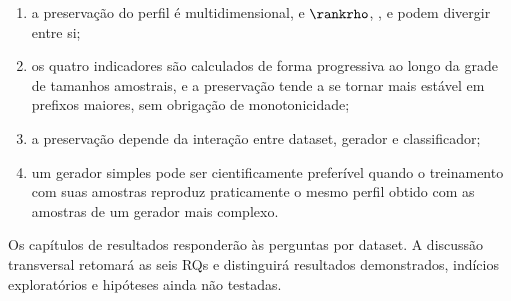 \begin{enumerate}
  \item a preservação do perfil é multidimensional, e $\rankrho$, \WinnersAgreement{}, \ReversalExistenceAgreement{} e \ReversalSampleSizeSimilarity{} podem divergir entre si;
  \item os quatro indicadores são calculados de forma progressiva ao longo da grade de tamanhos amostrais, e a preservação tende a se tornar mais estável em prefixos maiores, sem obrigação de monotonicidade;
  \item a preservação depende da interação entre dataset, gerador e classificador;
  \item um gerador simples pode ser cientificamente preferível quando o treinamento com suas amostras reproduz praticamente o mesmo perfil obtido com as amostras de um gerador mais complexo.
\end{enumerate}

Os capítulos de resultados responderão às perguntas por dataset. A discussão transversal retomará as seis RQs e distinguirá resultados demonstrados, indícios exploratórios e hipóteses ainda não testadas.
